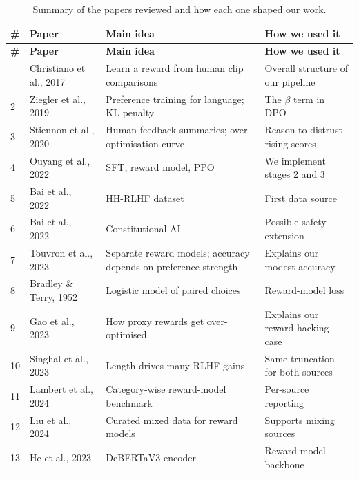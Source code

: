 {\small
\begin{longtable}{@{}L{0.6cm}L{3.6cm}L{5.0cm}L{4.9cm}@{}}
\caption[Summary of reviewed papers]{Summary of the papers reviewed and how each one shaped our work.}\label{tab:lit-summary}\\
\toprule
\textbf{\#} & \textbf{Paper} & \textbf{Main idea} & \textbf{How we used it}\\
\midrule\endfirsthead
\toprule
\textbf{\#} & \textbf{Paper} & \textbf{Main idea} & \textbf{How we used it}\\
\midrule\endhead
\bottomrule{} & Christiano et al., 2017~\cite{christiano2017deep} & Learn a reward from human clip comparisons & Overall structure of our pipeline\\
2 & Ziegler et al., 2019~\cite{ziegler2019finetuning} & Preference training for language; KL penalty & The $\beta$ term in DPO\\
3 & Stiennon et al., 2020~\cite{stiennon2020summarize} & Human-feedback summaries; over-optimisation curve & Reason to distrust rising scores\\
4 & Ouyang et al., 2022~\cite{ouyang2022instructgpt} & SFT, reward model, PPO & We implement stages 2 and 3\\
5 & Bai et al., 2022~\cite{bai2022hh} & HH-RLHF dataset & First data source\\
6 & Bai et al., 2022~\cite{bai2022cai} & Constitutional AI & Possible safety extension\\
7 & Touvron et al., 2023~\cite{touvron2023llama2} & Separate reward models; accuracy depends on preference strength & Explains our modest accuracy\\
8 & Bradley \& Terry, 1952~\cite{bradley1952rank} & Logistic model of paired choices & Reward-model loss\\
9 & Gao et al., 2023~\cite{gao2023overoptimization} & How proxy rewards get over-optimised & Explains our reward-hacking case\\
10 & Singhal et al., 2023~\cite{singhal2023length} & Length drives many RLHF gains & Same truncation for both sources\\
11 & Lambert et al., 2024~\cite{lambert2024rewardbench} & Category-wise reward-model benchmark & Per-source reporting\\
12 & Liu et al., 2024~\cite{liu2024skywork} & Curated mixed data for reward models & Supports mixing sources\\
13 & He et al., 2023~\cite{he2023debertav3} & DeBERTaV3 encoder & Reward-model backbone\\

\end{longtable}}

